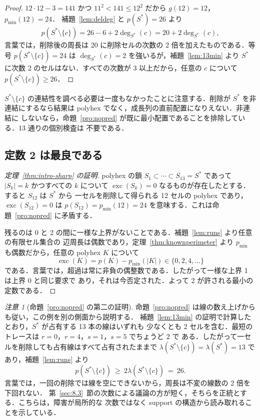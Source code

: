 \documentclass[11pt]{article}
\theoremstyle{plain}
\theoremstyle{definition}
\theoremstyle{remark}
\newtheorem{remark}[theorem]{注意}
\newcommand{\sm}{\setminus}
\DeclareMathOperator{\exc}{exc}
\newcommand{\dg}{\operatorname{deg}}
\begin{document}
\begin{proof}
\(12\cdot12-3=141\) かつ \(11^{2}<141\le12^{2}\) だから \(g(12)=12\)，\(p_{\min}(12)=24\)．
補題~\ref{lem:deldeg} と \(p(S^{\ast})=26\) より
\[
   p(S^{\ast}\sm\{c\})=26-6+2\dg_{S^{\ast}}(c)=20+2\dg_{S^{\ast}}(c),
\]
言葉では，削除後の周長は 20 に削除セルの次数の 2 倍を加えたものである．等号
\(p(S^{\ast}\sm\{c\})=24\) は \(\dg_{S^{\ast}}(c)=2\) を強いるが，補題~\ref{lem:13min} より
\(S^{\ast}\) に次数 2 のセルはない．すべての次数が 3 以上だから，任意の \(c\) について
\(p(S^{\ast}\sm\{c\})\ge26\)．
\end{proof}

\(S^{\ast}\sm\{c\}\) の連結性を調べる必要は一度もなかったことに注意する．削除が
\(S^{\ast}\) を非連結にするなら結果は polyhex でなく，成長列の直前配置になりえない．非連結に
しないなら，命題~\ref{pro:nopred} が既に最小配置であることを排除している．13 通りの個別検査は
不要である．

\subsection{定数 2 は最良である}\label{sec:8.4}

\begin{proof}[定理~\ref{thm:intro-sharp} の証明]
polyhex の鎖 \(S_{1}\subset\cdots\subset S_{13}=S^{*}\) であって \(|S_{k}|=k\) かつすべての
\(k\) について \(\exc(S_{k})=0\) なるものが存在したとする．すると \(S_{12}\) は \(S^{*}\) から
一セルを削除して得られる 12 セルの polyhex であり，\(\exc(S_{12})=0\) は
\(p(S_{12})=p_{\min}(12)=24\) を意味する．これは命題~\ref{pro:nopred} に矛盾する．

残るのは 0 と 2 の間に一様な上界がないことである．補題~\ref{lem:runs} より任意の有限セル集合の
辺周長は偶数であり，定理~\ref{thm:knownperimeter} より \(p_{\min}\) も偶数だから，任意の polyhex
\(K\) について
\[
   \exc(K)=p(K)-p_{\min}(|K|)\in\{0,2,4,\dots\}
\]
である．言葉では，超過は常に非負の偶整数である．したがって一様な上界 1 は上界 0 と同じ要求で
あり，それは今否定された．よって 2 が許される最小の定数である．
\end{proof}

\begin{remark}[命題~\ref{pro:nopred} の第二の証明]\label{rem:linecount}
命題~\ref{pro:nopred} は線の数え上げからも従い，この例を別の側面から説明する．
補題~\ref{lem:13min} の証明で計算したとおり，\(S^{\ast}\) が占有する 13 本の線はいずれも
少なくとも 2 セルを含む．最短のトレースは \(r=0\)，\(r=4\)，\(s=1\)，\(s=5\) でちょうど 2 で
ある．したがって一セルを削除しても占有線はすべて占有されたままで
\(\lambda(S^{\ast}\sm\{c\})=\lambda(S^{\ast})=13\) であり，補題~\ref{lem:runs} より
\[
   p(S^{\ast}\sm\{c\})\ \ge\ 2\lambda(S^{\ast}\sm\{c\})\ =\ 26 .
\]
言葉では，一回の削除では線を空にできないから，周長は不変の線数の 2 倍を下回れない．
第~\ref{sec:8.3}~節の次数による議論の方が短く，そちらを正統とする．こちらは，障害が局所的な
次数ではなく support の構造から読み取れることを示している．
\end{remark}
\end{document}

